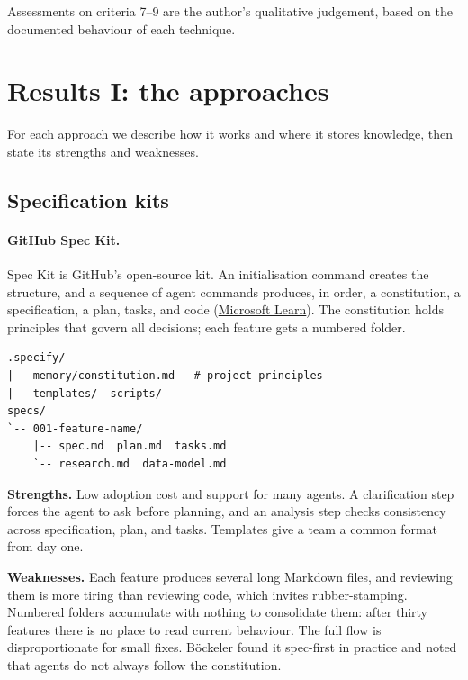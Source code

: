 \documentclass[11pt]{article}
\begin{document}
Assessments on criteria 7--9 are the author's qualitative judgement, based on the documented behaviour of each technique.

\section{Results I: the approaches}

For each approach we describe how it works and where it stores knowledge, then state its strengths and weaknesses.

\subsection{Specification kits}

\paragraph{GitHub Spec Kit.} Spec Kit is GitHub's open-source kit. An initialisation command creates the structure, and a sequence of agent commands produces, in order, a constitution, a specification, a plan, tasks, and code (\href{https://learn.microsoft.com/en-us/training/modules/spec-driven-development-github-spec-kit-greenfield-intro/8-examine-github-spec-kit-commands-results?pivots=text}{Microsoft Learn}). The constitution holds principles that govern all decisions; each feature gets a numbered folder.

\begin{verbatim}
.specify/
|-- memory/constitution.md   # project principles
|-- templates/  scripts/
specs/
`-- 001-feature-name/
    |-- spec.md  plan.md  tasks.md
    `-- research.md  data-model.md
\end{verbatim}

\textbf{Strengths.} Low adoption cost and support for many agents. A clarification step forces the agent to ask before planning, and an analysis step checks consistency across specification, plan, and tasks. Templates give a team a common format from day one.

\textbf{Weaknesses.} Each feature produces several long Markdown files, and reviewing them is more tiring than reviewing code, which invites rubber-stamping. Numbered folders accumulate with nothing to consolidate them: after thirty features there is no place to read current behaviour. The full flow is disproportionate for small fixes. B\"ockeler found it spec-first in practice and noted that agents do not always follow the constitution.
\end{document}
